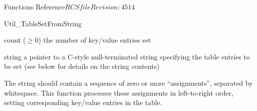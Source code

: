 \begin{cactuspart}{ Functions Reference}{$RCSfile$}{$Revision: 4514 $}
\begin{FunctionDescription}{Util\_TableSetFromString}
\begin{ResultSection}
\begin{Result}{count ($\ge 0$)}
the number of key/value entries set
\end{Result}
\end{ResultSection}

\begin{ParameterSection}
\begin{Parameter}{string}
a pointer to a C-style null-terminated string specifying the table
entries to be set (see below for details on the string contents)
\end{Parameter}
\end{ParameterSection}

\begin{Discussion}
The string should contain a sequence of zero or more 
``assignments'', separated by whitespace.  This function processes
these assignments in left-to-right order, setting corresponding key/value
entries in the table.


\end{Discussion}
\end{FunctionDescription}
\end{cactuspart}
